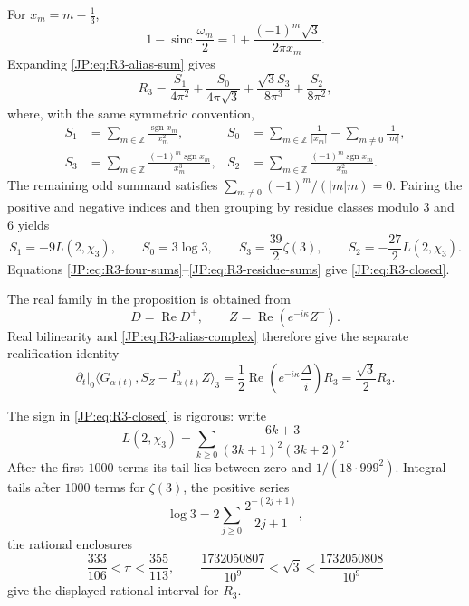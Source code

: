 For $x_m=m-\frac13$,
\[
 1-\operatorname{sinc}\frac{\omega_m}{2}
 =1+\frac{(-1)^m\sqrt3}{2\pi x_m}.
\]
Expanding \eqref{JP:eq:R3-alias-sum} gives
\begin{equation}\label{JP:eq:R3-four-sums}
 R_3=\frac{S_1}{4\pi^2}
 +\frac{S_0}{4\pi\sqrt3}
 +\frac{\sqrt3S_3}{8\pi^3}
 +\frac{S_2}{8\pi^2},
\end{equation}
where, with the same symmetric convention,
\[
\begin{aligned}
 S_1&=\sum_{m\in\mathbb Z}
 \frac{\operatorname {sgn}x_m}{x_m^2},&
 S_0&=\sum_{m\in\mathbb Z}\frac1{|x_m|}
      -\sum_{m\ne0}\frac1{|m|},\\
 S_3&=\sum_{m\in\mathbb Z}
 \frac{(-1)^m\operatorname {sgn}x_m}{x_m^3},&
 S_2&=\sum_{m\in\mathbb Z}
 \frac{(-1)^m\operatorname {sgn}x_m}{x_m^2}.
\end{aligned}
\]
The remaining odd summand satisfies
$\sum_{m\ne0}(-1)^m/(|m|m)=0$.  Pairing the positive and negative
indices and then grouping by residue classes modulo $3$ and $6$ yields
\begin{equation}\label{JP:eq:R3-residue-sums}
 S_1=-9L(2,\chi_3),\qquad S_0=3\log3,\qquad
 S_3=\frac{39}{2}\zeta(3),\qquad
 S_2=-\frac{27}{2}L(2,\chi_3).
\end{equation}
Equations \eqref{JP:eq:R3-four-sums}--\eqref{JP:eq:R3-residue-sums} give
\eqref{JP:eq:R3-closed}.

The real family in the proposition is obtained from
\[
 D=\operatorname {Re}D^+,\qquad
 Z=\operatorname {Re}(e^{-i\kappa}Z^-).
\]
Real bilinearity and \eqref{JP:eq:R3-alias-complex} therefore give the
separate realification identity
\begin{equation}\label{JP:eq:R3-alias-real}
 \left.\partial_t\right|_0
 \langle G_{\alpha(t)},S_Z-I_{\alpha(t)}^0Z\rangle_3
 =\frac12\operatorname {Re}
 \left(e^{-i\kappa}\frac{\Delta}{i}\right)R_3
 =\frac{\sqrt3}{2}R_3.
\end{equation}

The sign in \eqref{JP:eq:R3-closed} is rigorous: write
\[
 L(2,\chi_3)=\sum_{k\ge0}
 \frac{6k+3}{(3k+1)^2(3k+2)^2}.
\]
After the first $1000$ terms its tail lies between zero and
$1/(18\cdot999^2)$.  Integral tails after $1000$ terms for $\zeta(3)$,
the positive series
\[
\log3=2\sum_{j\ge0}\frac{2^{-(2j+1)}}{2j+1},
\]
the rational enclosures
\[
 \frac{333}{106}<\pi<\frac{355}{113},\qquad
 \frac{1732050807}{10^9}<\sqrt3<\frac{1732050808}{10^9}
\]
give the displayed rational interval for $R_3$.

